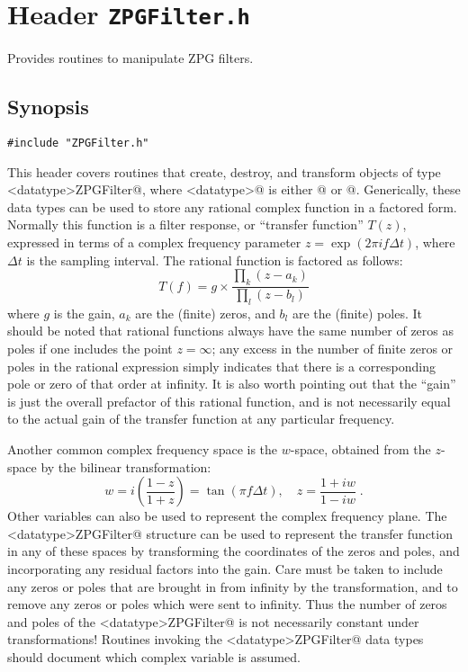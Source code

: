 
\section{Header \texttt{ZPGFilter.h}}

Provides routines to manipulate ZPG filters.

\subsection{Synopsis}
\begin{verbatim}
#include "ZPGFilter.h"
\end{verbatim}

\noindent This header covers routines that create, destroy, and
transform objects of type \verb@<datatype>ZPGFilter@, where
\verb@<datatype>@ is either @ or @.
Generically, these data types can be used to store any rational
complex function in a factored form.  Normally this function is a
filter response, or ``transfer function'' $T(z)$, expressed in terms
of a complex frequency parameter $z=\exp(2\pi if\Delta t)$, where
$\Delta t$ is the sampling interval.  The rational function is
factored as follows:
$$
T(f) = g\times\frac{\prod_k (z-a_k)}{\prod_l (z-b_l)}
$$
where $g$ is the gain, $a_k$ are the (finite) zeros, and $b_l$ are the
(finite) poles.  It should be noted that rational functions always
have the same number of zeros as poles if one includes the point
$z=\infty$; any excess in the number of finite zeros or poles in the
rational expression simply indicates that there is a corresponding
pole or zero of that order at infinity.  It is also worth pointing out
that the ``gain'' is just the overall prefactor of this rational
function, and is not necessarily equal to the actual gain of the
transfer function at any particular frequency.

Another common complex frequency space is the $w$-space, obtained
from the $z$-space by the bilinear transformation:
$$
w = i\left(\frac{1-z}{1+z}\right) = \tan(\pi f\Delta t) , \quad
z = \frac{1+iw}{1-iw} \; .
$$
Other variables can also be used to represent the complex frequency
plane.  The \verb@<datatype>ZPGFilter@ structure can be used to
represent the transfer function in any of these spaces by transforming
the coordinates of the zeros and poles, and incorporating any residual
factors into the gain.  Care must be taken to include any zeros or
poles that are brought in from infinity by the transformation, and to
remove any zeros or poles which were sent to infinity.  Thus the
number of zeros and poles of the \verb@<datatype>ZPGFilter@ is not
necessarily constant under transformations!  Routines invoking the
\verb@<datatype>ZPGFilter@ data types should document which complex
variable is assumed.


